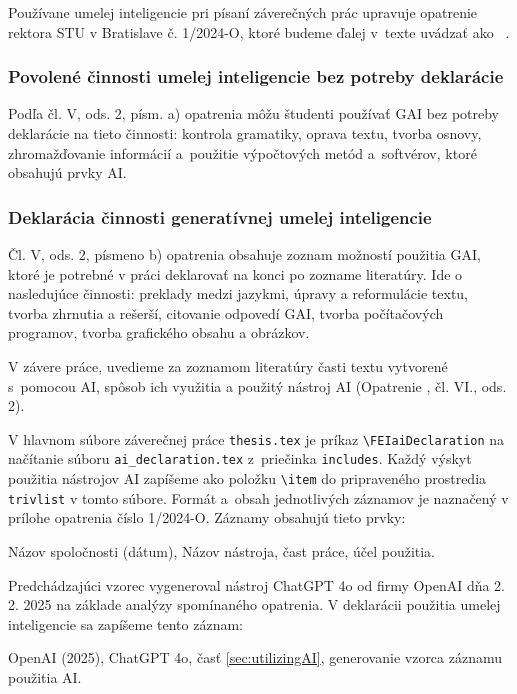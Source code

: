 Používane umelej inteligencie pri písaní záverečných prác
upravuje opatrenie rektora STU v Bratislave č. 1/2024-O, ktoré budeme ďalej v~texte uvádzať ako ~\cite{opatrenie12024}.

\subsubsection*{Povolené činnosti umelej inteligencie bez potreby deklarácie}
Podľa čl. V, ods. 2, písm. a) opatrenia môžu študenti používať GAI bez potreby deklarácie na tieto činnosti: kontrola gramatiky, oprava textu, tvorba osnovy, zhromažďovanie informácií a~použitie výpočtových metód a~softvérov, ktoré obsahujú prvky AI.

\subsubsection*{Deklarácia činnosti generatívnej umelej inteligencie}
Čl. V, ods. 2, písmeno b) opatrenia obsahuje zoznam možností použitia GAI, ktoré je potrebné v práci deklarovať na konci po zozname literatúry.
Ide o nasledujúce činnosti: preklady medzi jazykmi, úpravy a reformulácie textu, tvorba zhrnutia a rešerší, citovanie odpovedí GAI, tvorba počítačových programov, tvorba grafického obsahu a obrázkov.

V závere práce, uvedieme za zoznamom literatúry
časti textu vytvorené s~pomocou AI, spôsob ich využitia a použitý nástroj AI (Opatrenie \cite{opatrenie12024}, čl. VI., ods. 2).

V hlavnom súbore záverečnej práce \verb|thesis.tex| je príkaz
\verb|\FEIaiDeclaration| na načítanie súboru \verb|ai_declaration.tex| z~priečinka \verb|includes|.
Každý výskyt použitia nástrojov AI zapíšeme ako
položku \verb|\item| do pripraveného prostredia
\verb|trivlist| v tomto súbore.
Formát a~obsah jednotlivých záznamov je naznačený v prílohe opatrenia číslo 1/2024-O.
Záznamy obsahujú tieto prvky:
\begin{trivlist}
  \item Názov spoločnosti (dátum), Názov nástroja, čast práce, účel použitia.
\end{trivlist}

Predchádzajúci vzorec vygeneroval nástroj ChatGPT 4o od firmy
OpenAI dňa 2. 2. 2025 na základe analýzy spomínaného opatrenia.
V deklarácii použitia umelej inteligencie sa zapíšeme tento
záznam:
\begin{trivlist}
  \item OpenAI (2025), ChatGPT 4o, časť \ref{sec:utilizingAI},
  generovanie vzorca záznamu použitia AI.
\end{trivlist}

